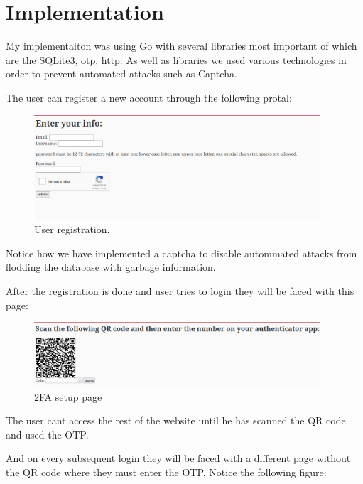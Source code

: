 \documentclass[a4paper]{article}
\begin{document}
\section{Implementation}
My implementaiton was using Go with several libraries most important of which are the SQLite3, otp, http. 
As well as libraries we used various technologies in order to prevent automated attacks such as Captcha.

The user can register a new account through the following protal:

\begin{figure}[H]
    \begin{center}
        \includegraphics[width=0.95\textwidth]{reg.png}
    \end{center}
    \caption{User registration.}\label{fig:}
\end{figure}

Notice how we have implemented a captcha to disable autommated attacks from flodding the database with garbage information.

After the registration is done and user tries to login they will be faced with this page:

\begin{figure}[H]
    \begin{center}
        \includegraphics[width=0.95\textwidth]{auth_app.png}
    \end{center}
    \caption{2FA setup page}\label{fig:}
\end{figure}

The user cant access the rest of the website until he has scanned the QR code and used the OTP.

And on every subsequent login they will be faced with a different page without the QR code where they must enter the OTP. Notice the following figure:
\end{document}
